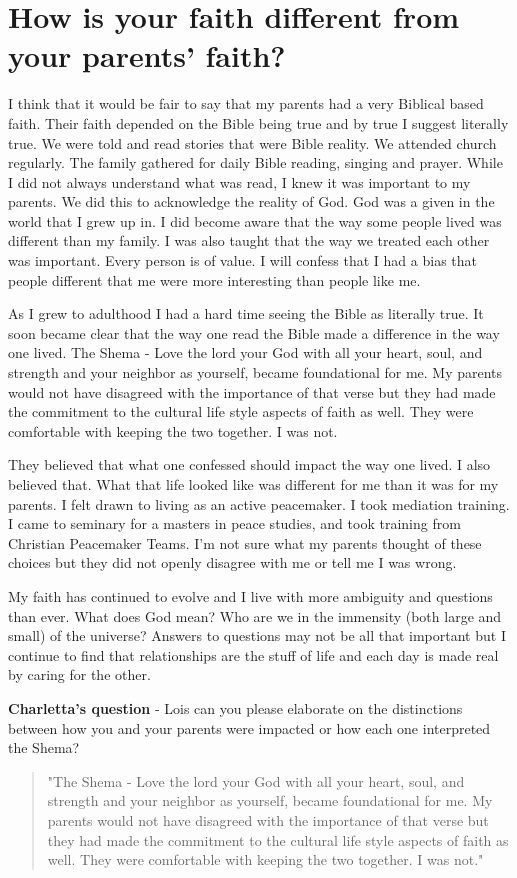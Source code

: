 \section{How is your faith different from your parents' faith?}
I think that it would be fair to say that my parents had a very Biblical based faith.
Their faith depended on the Bible being true and by true I suggest literally true.
We were told and read stories that were Bible reality.
We attended church regularly.
The family gathered for daily Bible reading, singing and prayer.
While I did not always understand what was read, I knew it was important to my parents.
We did this to acknowledge the reality of God.
God was a given in the world that I grew up in.
I did become aware that the way some people lived was different than my family.
I was also taught that the way we treated each other was important.
Every person is of value.
I will confess that I had a bias that people different that me were more interesting than people like me.

As I grew to adulthood I had a hard time seeing the Bible as literally true.
It soon became clear that the way one read the Bible made a difference in the way one lived.
The Shema - Love the lord your God with all your heart, soul, and strength and your neighbor as yourself, became foundational for me.
My parents would not have disagreed with the importance of that verse but they had made the commitment to the cultural life style aspects of faith as well.
They were comfortable with keeping the two together.
I was not.

They believed that what one confessed should impact the way one lived.
I also believed that.
What that life looked like was different for me than it was for my parents.
I felt drawn to living as an active peacemaker.
I took mediation training.
I came to seminary for a masters in peace studies, and took training from Christian Peacemaker Teams.
I'm not sure what my parents thought of these choices but they did not openly disagree with me or tell me I was wrong.

My faith has continued to evolve and I live with more ambiguity and questions than ever.
What does God mean?
Who are we in the immensity (both large and small) of the universe?
Answers to questions may not be all that important but I continue to find that relationships are the stuff of life and each day is made real by caring for the other.

\textbf{Charletta's question} - Lois can you please elaborate on the distinctions between how you and your parents were impacted or how each one interpreted the Shema?
\begin{quotation}
"The Shema - Love the lord your God with all your heart, soul, and strength and your neighbor as yourself, became foundational for me.
My parents would not have disagreed with the importance of that verse but they had made the commitment to the cultural life style aspects of faith as well.
They were comfortable with keeping the two together.
I was not."
\end{quotation}

